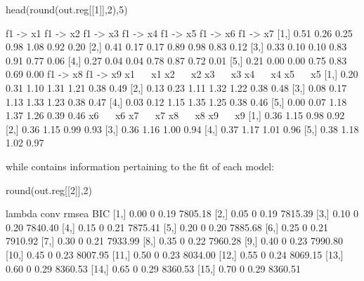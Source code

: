\documentclass[article]{jss}
\begin{document}
\begin{CodeChunk}
\begin{CodeInput}
head(round(out.reg[[1]],2),5)
\end{CodeInput}
\begin{CodeOutput}
     f1 -> x1 f1 -> x2 f1 -> x3 f1 -> x4 f1 -> x5 f1 -> x6 f1 -> x7
[1,]     0.51     0.26     0.25     0.98     1.08     0.92     0.20
[2,]     0.41     0.17     0.17     0.89     0.98     0.83     0.12
[3,]     0.33     0.10     0.10     0.83     0.91     0.77     0.06
[4,]     0.27     0.04     0.04     0.78     0.87     0.72     0.01
[5,]     0.21     0.00     0.00     0.75     0.83     0.69     0.00
     f1 -> x8 f1 -> x9 x1 ~~ x1 x2 ~~ x2 x3 ~~ x3 x4 ~~ x4 x5 ~~ x5
[1,]     0.20     0.31     1.10     1.31     1.21     0.38     0.49
[2,]     0.13     0.23     1.11     1.32     1.22     0.38     0.48
[3,]     0.08     0.17     1.13     1.33     1.23     0.38     0.47
[4,]     0.03     0.12     1.15     1.35     1.25     0.38     0.46
[5,]     0.00     0.07     1.18     1.37     1.26     0.39     0.46
     x6 ~~ x6 x7 ~~ x7 x8 ~~ x8 x9 ~~ x9
[1,]     0.36     1.15     0.98     0.92
[2,]     0.36     1.15     0.99     0.93
[3,]     0.36     1.16     1.00     0.94
[4,]     0.37     1.17     1.01     0.96
[5,]     0.38     1.18     1.02     0.97
\end{CodeOutput}
\end{CodeChunk}

while  contains information pertaining to the fit of
each model:

\begin{CodeChunk}
\begin{CodeInput}
round(out.reg[[2]],2)
\end{CodeInput}
\begin{CodeOutput}
      lambda conv rmsea     BIC
 [1,]   0.00    0  0.19 7805.18
 [2,]   0.05    0  0.19 7815.39
 [3,]   0.10    0  0.20 7840.40
 [4,]   0.15    0  0.21 7875.41
 [5,]   0.20    0  0.20 7885.68
 [6,]   0.25    0  0.21 7910.92
 [7,]   0.30    0  0.21 7933.99
 [8,]   0.35    0  0.22 7960.28
 [9,]   0.40    0  0.23 7990.80
[10,]   0.45    0  0.23 8007.95
[11,]   0.50    0  0.23 8034.00
[12,]   0.55    0  0.24 8069.15
[13,]   0.60    0  0.29 8360.53
[14,]   0.65    0  0.29 8360.53
[15,]   0.70    0  0.29 8360.51
\end{CodeOutput}
\end{CodeChunk}
\end{document}
